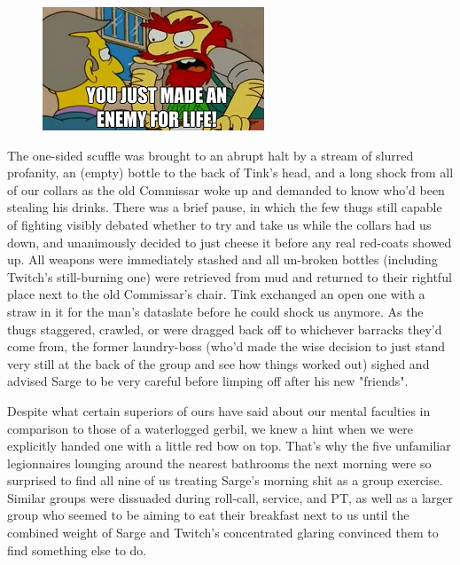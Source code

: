 \begin{figure}
	\begin{center}
		\includegraphics[width=\figwidth]{pics/21/38.png}
	\end{center}
\end{figure}
The one-sided scuffle was brought to an abrupt halt by a stream of slurred profanity, an (empty) bottle to the back of Tink's head, and a long shock from all of our collars as the old Commissar woke up and demanded to know who'd been stealing his drinks. 
There was a brief pause, in which the few thugs still capable of fighting visibly debated whether to try and take us while the collars had us down, and unanimously decided to just cheese it before any real red-coats showed up. 
All weapons were immediately stashed and all un-broken bottles (including Twitch's still-burning one) were retrieved from mud and returned to their rightful place next to the old Commissar's chair. 
Tink exchanged an open one with a straw in it for the man's dataslate before he could shock us anymore. 
As the thugs staggered, crawled, or were dragged back off to whichever barracks they'd come from, the former laundry-boss (who'd made the wise decision to just stand very still at the back of the group and see how things worked out) sighed and advised Sarge to be very careful before limping off after his new "friends". 


Despite what certain superiors of ours have said about our mental faculties in comparison to those of a waterlogged gerbil, we knew a hint when we were explicitly handed one with a little red bow on top. 
That's why the five unfamiliar legionnaires lounging around the nearest bathrooms the next morning were so surprised to find all nine of us treating Sarge's morning shit as a group exercise. 
Similar groups were dissuaded during roll-call, service, and PT, as well as a larger group who seemed to be aiming to eat their breakfast next to us until the combined weight of Sarge and Twitch's concentrated glaring convinced them to find something else to do.

